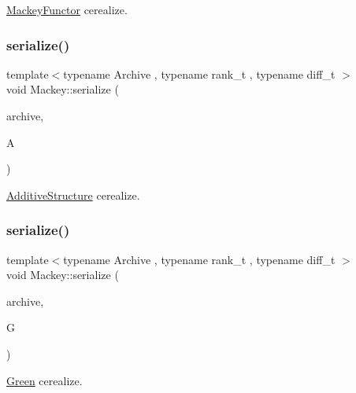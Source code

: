 \hyperlink{classMackey_1_1MackeyFunctor}{Mackey\+Functor} cerealize. 

\mbox{\label{namespaceMackey_a73c4c78b9c9858acc875da9516535d4b}} 
\subsubsection{\texorpdfstring{serialize()}{serialize()}\hspace{0.1cm}{\footnotesize\ttfamily [4/6]}}
{\footnotesize\ttfamily template$<$typename Archive , typename rank\+\_\+t , typename diff\+\_\+t $>$ \\
void Mackey\+::serialize (\begin{DoxyParamCaption}\item[{Archive \&}]{archive,  }\item[{\hyperlink{classMackey_1_1AdditiveStructure}{Additive\+Structure}$<$ rank\+\_\+t, diff\+\_\+t $>$ \&}]{A }\end{DoxyParamCaption})}



\hyperlink{classMackey_1_1AdditiveStructure}{Additive\+Structure} cerealize. 

\mbox{\label{namespaceMackey_ae6ccf7fecc4fc52a3c7b31876106ae2c}} 
\subsubsection{\texorpdfstring{serialize()}{serialize()}\hspace{0.1cm}{\footnotesize\ttfamily [5/6]}}
{\footnotesize\ttfamily template$<$typename Archive , typename rank\+\_\+t , typename diff\+\_\+t $>$ \\
void Mackey\+::serialize (\begin{DoxyParamCaption}\item[{Archive \&}]{archive,  }\item[{\hyperlink{classMackey_1_1Green}{Green}$<$ rank\+\_\+t, diff\+\_\+t $>$ \&}]{G }\end{DoxyParamCaption})}



\hyperlink{classMackey_1_1Green}{Green} cerealize. 

\mbox{\label{namespaceMackey_ae5d73f6ab42eb8fe9ae441e3ffc4b3a5}} 
